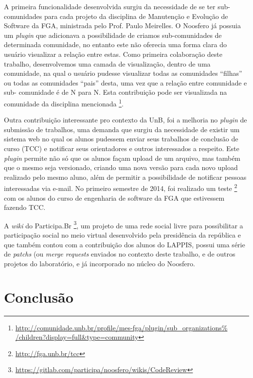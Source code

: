 \documentclass[12pt]{article}
\begin{document}
A primeira funcionalidade desenvolvida surgiu da necessidade de se ter sub-%
comunidades para cada projeto da disciplina de Manutenção e Evolução de
Software da FGA, ministrada pelo Prof. Paulo Meirelles. O Noosfero já possuia
um \textit{plugin} que adicionava a possibilidade de criamos sub-comunidades
de determinada comunidade, no entanto este não oferecia uma forma clara do
usuário visualizar a relação entre estas. Como primeira colaboração deste
trabalho, desenvolvemos uma camada de visualização, dentro de uma comunidade,
na qual o usuário pudesse visualizar todas as comunidades ``filhas'' ou todas
as comunidades ``pais'' desta, uma vez que a relação entre comunidade e sub-%
comunidade é de N para N. Esta contribuição pode ser visualizada na comunidade
da disciplina mencionada%
\footnote{\url{http://comunidade.unb.br/profile/mes-fga/plugin/sub_organizations%
/children?display=full&type=community}}.

Outra contribuição interessante pro contexto da UnB, foi a melhoria no
\textit{plugin} de submissão de trabalhos, uma demanda que surgiu da
necessidade de existir um sistema web no qual os alunos pudessem enviar
seus trabalhos de conclusão de curso (TCC) e notificar seus orientadores e outros
interessados a respeito. Este \textit{plugin} permite não só que os alunos
façam upload de um arquivo, mas também que o mesmo seja versionado, criando
uma nova versão para cada novo upload realizado pelo mesmo aluno, além de
permitir a possibilidade de notificar pessoas interessadas via e-mail.
No primeiro semestre de 2014, foi realizado um teste%
\footnote{\url{http://fga.unb.br/tcc}} com os alunos do curso de engenharia de
software da FGA que estivessem fazendo TCC.

A \textit{wiki} do Participa.Br%
\footnote{\url{https://gitlab.com/participa/noosfero/wikis/CodeReview}},
um projeto de uma rede social livre para
possibilitar a participação social no meio virtual desenvolvido pela
presidência da república e que também contou com a contribuição dos alunos
do LAPPIS, possui uma série de \textit{patchs} (ou \textit{merge requests}
enviados no contexto deste trabalho, e de outros projetos do laboratório, e
já incorporado no núcleo do Noosfero.

\section{Conclusão} \label{sec:conclusao}
\end{document}
